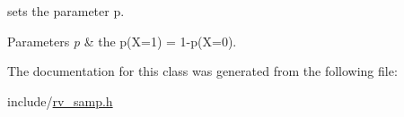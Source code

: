 sets the parameter p. 


\begin{DoxyParams}{Parameters}
{\em p} & the p(X=1) = 1-\/p(X=0). \\
\hline
\end{DoxyParams}


The documentation for this class was generated from the following file\+:\begin{DoxyCompactItemize}
\item 
include/\hyperlink{rv__samp_8h}{rv\+\_\+samp.\+h}\end{DoxyCompactItemize}
